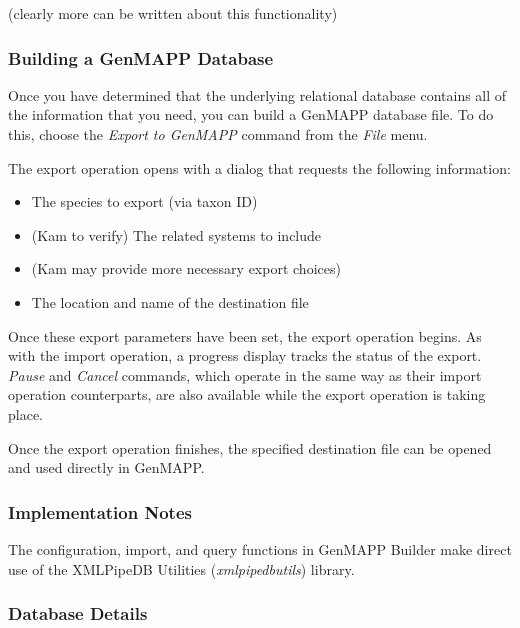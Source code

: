 \documentclass[11pt]{article}
\begin{document}
(clearly more can be written about this functionality)

\subsubsection{Building a GenMAPP Database}

Once you have determined that the underlying relational database contains all of the information that you need, you can build a GenMAPP database file.  To do this, choose the \textsl{Export to GenMAPP} command from the \textsl{File} menu.

The export operation opens with a dialog that requests the following information:
\begin{itemize}
\item The species to export (via taxon ID)
\item (Kam to verify) The related systems to include
\item (Kam may provide more necessary export choices)
\item The location and name of the destination file
\end{itemize}
Once these export parameters have been set, the export operation begins.  As with the import operation, a progress display tracks the status of the export.  \textsl{Pause} and \textsl{Cancel} commands, which operate in the same way as their import operation counterparts, are also available while the export operation is taking place.

Once the export operation finishes, the specified destination file can be opened and used directly in GenMAPP.

\subsubsection{Implementation Notes}

The configuration, import, and query functions in GenMAPP Builder make direct use of the XMLPipeDB Utilities (\emph{xmlpipedbutils}) library.

\subsubsection{Database Details}
\end{document}
